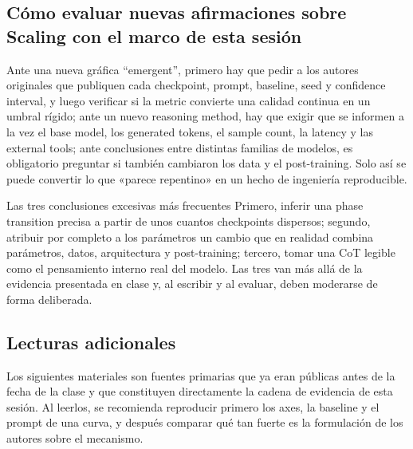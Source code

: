 \subsection{Cómo evaluar nuevas afirmaciones sobre Scaling con el marco de esta sesión}

Ante una nueva gráfica ``emergent'', primero hay que pedir a los autores originales que publiquen cada checkpoint, prompt, baseline, seed y confidence interval, y luego verificar si la metric convierte una calidad continua en un umbral rígido; ante un nuevo reasoning method, hay que exigir que se informen a la vez el base model, los generated tokens, el sample count, la latency y las external tools; ante conclusiones entre distintas familias de modelos, es obligatorio preguntar si también cambiaron los data y el post-training. Solo así se puede convertir lo que «parece repentino» en un hecho de ingeniería reproducible.

\begin{warningbox}{Las tres conclusiones excesivas más frecuentes}
Primero, inferir una phase transition precisa a partir de unos cuantos checkpoints dispersos; segundo, atribuir por completo a los parámetros un cambio que en realidad combina parámetros, datos, arquitectura y post-training; tercero, tomar una CoT legible como el pensamiento interno real del modelo. Las tres van más allá de la evidencia presentada en clase y, al escribir y al evaluar, deben moderarse de forma deliberada.
\end{warningbox}

\subsection{Lecturas adicionales}

Los siguientes materiales son fuentes primarias que ya eran públicas antes de la fecha de la clase y que constituyen directamente la cadena de evidencia de esta sesión. Al leerlos, se recomienda reproducir primero los axes, la baseline y el prompt de una curva, y después comparar qué tan fuerte es la formulación de los autores sobre el mecanismo.

